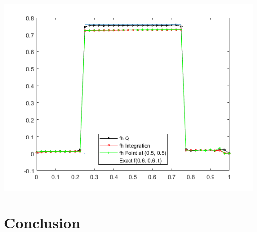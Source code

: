 \documentclass[]{article}
\begin{document}
\includegraphics[width=0.75\linewidth]{../FreeFem++/fht}
\justifying
\section{Conclusion}

{}

\end{document}
